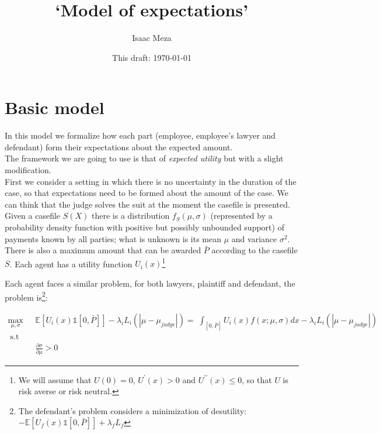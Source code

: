 \documentclass[10pt]{article}
\begin{document}
\title{`Model of expectations'}

\author{Isaac Meza}
\date{This draft: \today \\[2 cm] }

\maketitle


\section{Basic model}
In this model we formalize how each part (employee, employee's lawyer and defendant) form their expectations about the expected amount.\\

The framework we are going to use is that of \emph{expected utility} but with a slight modification. \\

First we consider a setting in which there is no uncertainty in the duration of the case, so that expectations need to be formed about the amount of the case. We can think that the judge solves the suit at the moment the casefile is presented.\\

Given a casefile $S(X)$ there is a distribution $f_S(\mu, \sigma)$ (represented by a probability density function with positive but possibly unbounded support) of  payments known by all parties; what is unknown is its mean $\mu$ and variance $\sigma^2$. There is also a maximum amount that can be awarded $\bar{P}$ according to the casefile $S$. Each agent has a utility function $U_i(x)$\footnote{We will assume that $U(0)=0$, $U^{\prime}(x)>0$ and $U^{\prime\prime}(x)\leq 0$, so that $U$ is risk averse or risk neutral.}

Each agent faces a similar problem, for both lawyers, plaintiff and defendant, the problem is\footnote{The defendant's problem considers a minimization of desutility: $-\mathbb{E}\left[U_f(x)\mathds{1}[0,\bar{P}]\right]+\lambda_fL_f$}:

\begin{align}
\label{max_problem_l}
\underset{\mu, \sigma}{\max}\;\;  & \mathbb{E}\left[U_i(x)\mathds{1}[0,\bar{P}]\right]-\lambda_iL_i(|\mu-\mu_{judge}|)=\; \int_{[0,\bar{P}]}U_i(x)f(x;\mu,\sigma)dx-\lambda_iL_i(|\mu-\mu_{judge}|) \\ \nonumber
\;  \text{s.t} & \\ 
\; \; \quad \quad & \frac{\partial \sigma}{\partial \mu}>0 \nonumber
\end{align}
\end{document}
